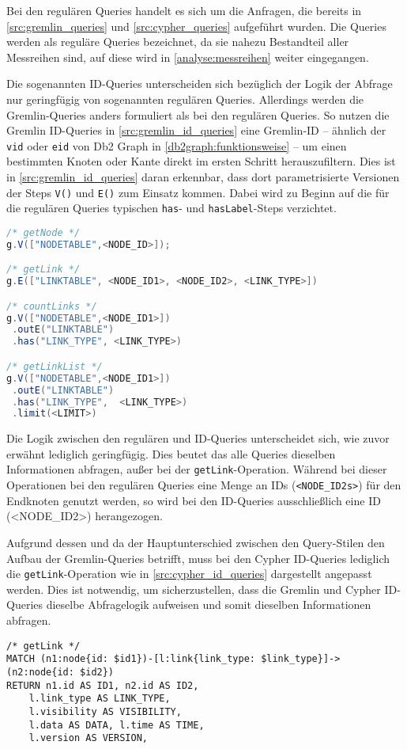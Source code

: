 Bei den regulären Queries handelt es sich um die Anfragen, die bereits in \autoref{src:gremlin_queries} und \autoref{src:cypher_queries} aufgeführt wurden. Die Queries werden als reguläre Queries bezeichnet, da sie nahezu Bestandteil aller Messreihen sind, auf diese wird in \autoref{analyse:messreihen} weiter eingegangen. 

Die sogenannten ID-Queries unterscheiden sich bezüglich der Logik der Abfrage nur geringfügig von sogenannten regulären Queries. Allerdings werden die Gremlin-Queries anders formuliert als bei den regulären Queries. So nutzen die Gremlin ID-Queries in \autoref{src:gremlin_id_queries} eine Gremlin-ID -- ähnlich der \texttt{vid} oder \texttt{eid} von Db2 Graph in \autoref{db2graph:funktionsweise} -- um einen bestimmten Knoten oder Kante direkt im ersten Schritt herauszufiltern. Dies ist in \autoref{src:gremlin_id_queries} daran erkennbar, dass dort parametrisierte Versionen der Steps \texttt{V()} und \texttt{E()} zum Einsatz kommen. Dabei wird zu Beginn auf die für die regulären Queries typischen \texttt{has}- und \texttt{hasLabel}-Steps verzichtet.

\begin{lstlisting}[label=src:gremlin_id_queries,caption={Gremlin ID-Queries},language=Java]
/* getNode */
g.V(["NODETABLE",<NODE_ID>]);

/* getLink */
g.E(["LINKTABLE", <NODE_ID1>, <NODE_ID2>, <LINK_TYPE>])

/* countLinks */
g.V(["NODETABLE",<NODE_ID1>])
 .outE("LINKTABLE")
 .has("LINK_TYPE", <LINK_TYPE>)

/* getLinkList */
g.V(["NODETABLE",<NODE_ID1>])
 .outE("LINKTABLE")
 .has("LINK_TYPE",  <LINK_TYPE>)
 .limit(<LIMIT>)
\end{lstlisting}

Die Logik zwischen den regulären und ID-Queries unterscheidet sich, wie zuvor erwähnt lediglich geringfügig. Dies beutet das alle Queries dieselben Informationen abfragen, außer bei der \texttt{getLink}-Operation. Während bei dieser Operationen bei den regulären Queries eine Menge an IDs (\texttt{<NODE\_ID2s>}) für den Endknoten genutzt werden, so wird bei den ID-Queries ausschließlich eine ID (<NODE\_ID2>) herangezogen. 

Aufgrund dessen und da der Hauptunterschied zwischen den Query-Stilen den Aufbau der Gremlin-Queries betrifft, muss bei den Cypher ID-Queries lediglich die \texttt{getLink}-Operation wie in \autoref{src:cypher_id_queries} dargestellt
angepasst werden. Dies ist notwendig, um sicherzustellen, dass die Gremlin und Cypher ID-Queries dieselbe Abfragelogik aufweisen und somit dieselben Informationen abfragen. 
\begin{lstlisting}[label=src:cypher_id_queries,caption={Cypher ID-Queries},language=CQL]
/* getLink */
MATCH (n1:node{id: $id1})-[l:link{link_type: $link_type}]->(n2:node{id: $id2}) 
RETURN n1.id AS ID1, n2.id AS ID2, 
    l.link_type AS LINK_TYPE, 
    l.visibility AS VISIBILITY, 
    l.data AS DATA, l.time AS TIME, 
    l.version AS VERSION,
\end{lstlisting}

